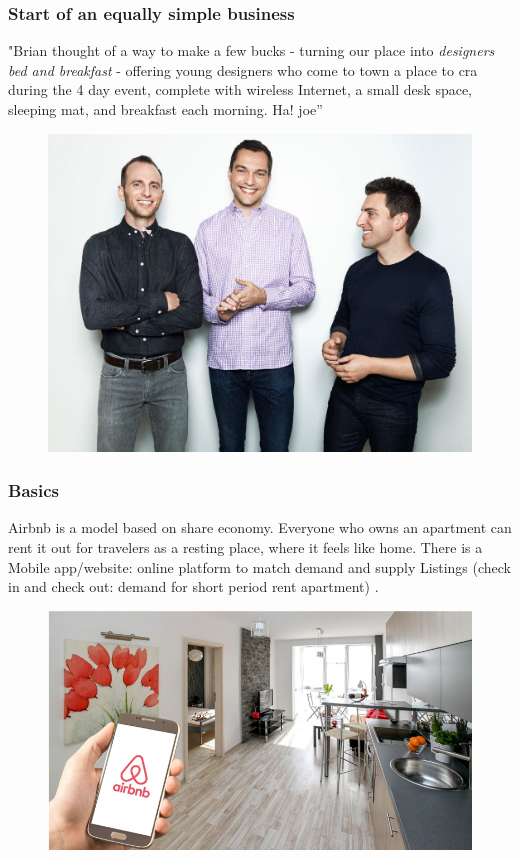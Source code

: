 \documentclass{beamer}
\begin{document}
\begin{frame}
\frametitle{Start of an equally simple business}
"Brian thought of a way to make a few bucks - turning
our place into \textit{designers bed and breakfast} - offering young
designers who come to town a place to cra during the 4 day
event, complete with wireless Internet, a small desk space,
sleeping mat, and breakfast each morning. Ha!
joe”
\begin{figure}
\includegraphics[width=0.4\linewidth]{photo/founders}
\end{figure}
\end{frame}


\begin{frame}
\frametitle{Basics}
Airbnb is a model based on share economy. Everyone who owns an apartment can rent it out for travelers as a resting place, where it feels like home. There is a Mobile app/website: online platform to match demand and supply Listings (check in and check out: demand for short period rent apartment) .
\begin{figure}
\includegraphics[width=0.4\linewidth]{photo/basics1}
\end{figure}
\end{frame}

\end{document}
